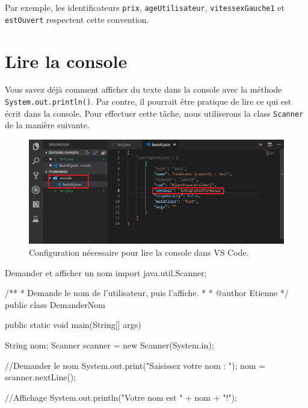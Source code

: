 \documentclass[12pt]{report}
\begin{document}
Par exemple, les identificateurs \texttt{prix}, \texttt{ageUtilisateur}, \texttt{vitessexGauche1} et \texttt{estOuvert} respectent cette convention. 




%
\section{Lire la console}
%
Vous savez déjà comment afficher du texte dans la console avec la méthode \texttt{System.out.println()}. Par contre, il pourrait être pratique de lire ce qui est écrit dans la console. Pour effectuer cette tâche, nous utiliserons la class \texttt{Scanner} de la manière suivante.

\begin{figure}[H]
\centering
\includegraphics[width=0.99\linewidth]{vscode-integrated-terminal.png}
\caption{Configuration nécessaire pour lire la console dans VS Code.}
\end{figure}

%
\begin{MyTCB}{Demander et afficher un nom}
import java.util.Scanner;

/**
 * Demande le nom de l'utilisateur, puis l'affiche.
 * 
 * @author Etienne
 */
public class DemanderNom {

	public static void main(String[] args) {
		
		String nom;
		Scanner scanner = new Scanner(System.in);
		
		//Demander le nom
		System.out.print("Saisissez votre nom : ");
		nom = scanner.nextLine();
		
		//Affichage
		System.out.println("Votre nom est " + nom + "!");

	}

}
\end{MyTCB}
\end{document}
